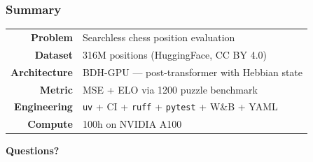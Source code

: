 \documentclass{beamer}
\begin{document}
\begin{frame}
\frametitle{Summary}

\begin{center}
\large
\begin{tabular}{rl}
\textbf{Problem} & Searchless chess position evaluation \\[0.5em]
\textbf{Dataset} & 316M positions (HuggingFace, CC BY 4.0) \\[0.5em]
\textbf{Architecture} & BDH-GPU --- post-transformer with Hebbian state \\[0.5em]
\textbf{Metric} & MSE + ELO via 1200 puzzle benchmark \\[0.5em]
\textbf{Engineering} & \texttt{uv} + CI + \texttt{ruff} + \texttt{pytest} + W\&B + YAML \\[0.5em]
\textbf{Compute} & 100h on NVIDIA A100 \\
\end{tabular}
\end{center}

\vspace{1em}
\begin{center}
\Large \textbf{Questions?}
\end{center}

\end{frame}
\end{document}
